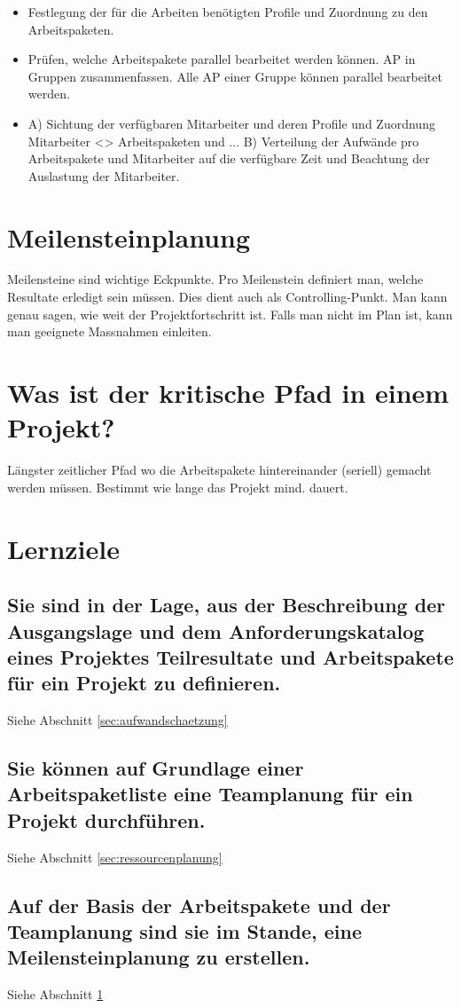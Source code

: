\begin{itemize}
	\item Festlegung der für die Arbeiten benötigten Profile und
	Zuordnung zu den Arbeitspaketen.
	\item Prüfen, welche Arbeitspakete parallel bearbeitet
	werden können. AP in Gruppen zusammenfassen. Alle AP einer Gruppe können parallel bearbeitet werden.
	\item A) Sichtung der verfügbaren Mitarbeiter und deren Profile und Zuordnung Mitarbeiter <> Arbeitspaketen	und ... B) Verteilung der Aufwände pro Arbeitspakete und Mitarbeiter auf die verfügbare Zeit und Beachtung der Auslastung der Mitarbeiter.
\end{itemize}

\section{Meilensteinplanung}
\label{sec:meilensteinplanung}
Meilensteine sind wichtige Eckpunkte. Pro Meilenstein definiert man, welche Resultate erledigt sein müssen. Dies dient auch als Controlling-Punkt. Man kann genau sagen, wie weit der Projektfortschritt ist. Falls man nicht im Plan ist, kann man geeignete Massnahmen einleiten.

\section{Was ist der kritische Pfad in einem Projekt?}
Längster zeitlicher Pfad wo die Arbeitspakete hintereinander (seriell) gemacht werden müssen. Bestimmt wie lange das Projekt mind. dauert.


\section{Lernziele}

\subsection{Sie sind in der Lage, aus der Beschreibung der Ausgangslage und dem Anforderungskatalog eines Projektes Teilresultate und Arbeitspakete für ein Projekt zu definieren.}
Siehe Abschnitt \ref{sec:aufwandschaetzung}

\subsection{Sie können auf Grundlage einer Arbeitspaketliste eine Teamplanung für ein Projekt durchführen.}
Siehe Abschnitt \ref{sec:ressourcenplanung}

\subsection{Auf der Basis der Arbeitspakete und der Teamplanung sind sie im Stande, eine Meilensteinplanung zu erstellen.}
Siehe Abschnitt \ref{sec:meilensteinplanung}
